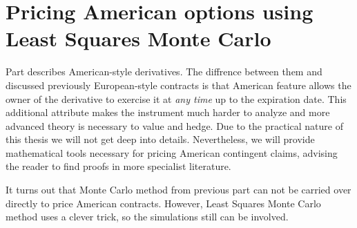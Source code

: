 \documentclass[a4paper,12pt, oneside]{book}
\theoremstyle{definition}
\theoremstyle{remark}
\begin{document}
\chapter[{Pricing American options using Least Squares Monte Carlo}]{Pricing American options using \\Least Squares Monte Carlo}
\label{chapter:pricingAmerican}
Part  describes American-style derivatives. The diffrence between them and discussed previously European-style contracts is that American feature allows the owner of the derivative to exercise it at \emph{any time} up to the expiration date. This additional attribute makes the instrument much harder to analyze and more advanced theory is necessary to value and hedge.
Due to the practical nature of this thesis we will not get deep into details. Nevertheless, we will provide mathematical tools necessary for pricing American contingent claims, advising the reader to find proofs in more specialist literature. 

It turns out that Monte Carlo method from previous part can not be carried over directly to price American contracts. However, Least Squares Monte Carlo method uses a clever trick, so the simulations still can be involved. 
\end{document}
